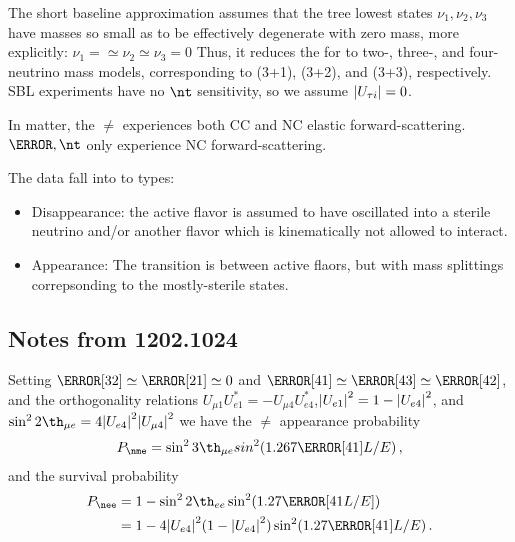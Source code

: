 \documentclass[twocolumn]{article}
\begin{document}
The short baseline approximation assumes that the tree lowest states $\nu_1, \nu_2, \nu_3$ have masses so small as to be effectively degenerate with zero mass, more explicitly: $\nu_1 =\simeq \nu_2 \simeq \nu_3 = 0$ Thus, it reduces the for to two-, three-, and four-neutrino mass models, corresponding to (3+1), (3+2), and (3+3), respectively. SBL experiments have no $\nt$ sensitivity, so we assume $\abs{U_{\tau i}} = 0$.

In matter, the $\ne$ experiences both CC and NC elastic forward-scattering. $\nm,\nt$ only experience NC forward-scattering.

The data fall into to types:
\begin{itemize}
  \item Disappearance: the active flavor is assumed to have oscillated into a sterile neutrino and/or another flavor which is kinematically not allowed to interact.
  \item Appearance: The transition is between active flaors, but with mass splittings correpsonding to the mostly-sterile states.
\end{itemize}

\subsection*{Notes from 1202.1024}
Setting $\dm[32] \simeq \dm[21] \simeq 0$ and $\dm[41] \simeq \dm[43] \simeq \dm[42]$, and the orthogonality relations $U_{\mu1} U_{e1}^* = -U_{\mu 4}U_{e4}^*$,$\abs{U_{e1}}^2 = 1-\abs{U_{e4}}^2$, and $\sin^2 2\th_{\mu e} = 4 \abs{U_{e4}}^2 \abs{U_{\mu 4}}^2$ we have the $\ne$ appearance probability
\begin{align*}
  P_{\nme} = \sin^2 3\th_{\mu e} sin^2(1.267\dm[41] L/E)
\,,\end{align*}
and the survival probability
\begin{align*}
  P_{\nee} &= 1- \sin^2 2\th_{ee} \sin^2(1.27 \dm[41 L/E]) \\
           &= 1 - 4\abs{U_{e4}}^2(1- \abs{U_{e4}}^2)\sin^2(1.27\dm[41]L/E)
\,.\end{align*}
\end{document}
